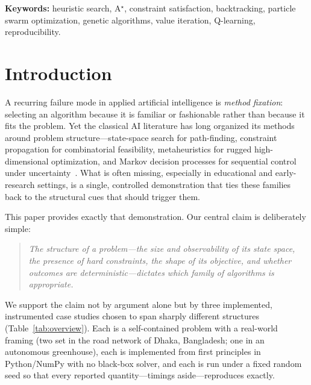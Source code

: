 \documentclass[10pt]{article}
\begin{document}
\smallskip
\noindent\textbf{Keywords:} heuristic search, A$^\star$, constraint satisfaction,
backtracking, particle swarm optimization, genetic algorithms, value iteration,
Q-learning, reproducibility.

\section{Introduction}
A recurring failure mode in applied artificial intelligence is \emph{method
fixation}: selecting an algorithm because it is familiar or fashionable rather
than because it fits the problem. Yet the classical AI literature has long
organized its methods around problem structure---state-space search for
path-finding, constraint propagation for combinatorial feasibility,
metaheuristics for rugged high-dimensional optimization, and Markov decision
processes for sequential control under uncertainty~\cite{russell2020,
pearl1984,dechter2003,sutton2018}. What is often missing, especially in
educational and early-research settings, is a single, controlled demonstration
that ties these families back to the structural cues that should trigger them.

This paper provides exactly that demonstration. Our central claim is deliberately
simple:

\begin{quote}\itshape
The structure of a problem---the size and observability of its state space, the
presence of hard constraints, the shape of its objective, and whether outcomes
are deterministic---dictates which family of algorithms is appropriate.
\end{quote}

\noindent
We support the claim not by argument alone but by three implemented,
instrumented case studies chosen to span sharply different structures
(Table~\ref{tab:overview}). Each is a self-contained problem with a real-world
framing (two set in the road network of Dhaka, Bangladesh; one in an autonomous
greenhouse), each is implemented from first principles in Python/NumPy with no
black-box solver, and each is run under a fixed random seed so that every
reported quantity---timings aside---reproduces exactly.
\end{document}

